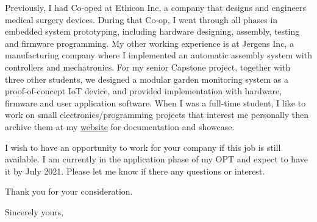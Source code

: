 \documentclass[11pt]{letter} %
\begin{document}
\begin{letter}
    \par Previously, I had Co-oped at Ethicon Inc, a company that designs and engineers medical surgery devices. During that Co-op, I went through all phases in embedded system prototyping, including hardware designing, assembly, testing and firmware programming.
    My other working experience is at Jergens Inc, a manufacturing company where I implemented an automatic assembly system with controllers and mechatronics.
    For my senior Capstone project, together with three other students, we designed a modular garden monitoring system as a proof-of-concept IoT device, and provided implementation with hardware, firmware and user application software.
    When I was a full-time student, I like to work on small electronics/programming projects that interest me personally then archive them at my \href{https://liu2z2.github.io/}{website} for documentation and showcase.

    \par I wish to have an opportunity to work for your company if this job is still available.
    I am currently in the application phase of my OPT and expect to have it by July 2021.
    Please let me know if there any questions or interest.

    \par Thank you for your consideration.

    \closing{Sincerely yours,}




\end{letter}
\end{document}
